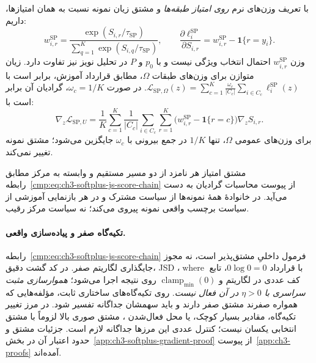 با تعریف وزن‌های نرم \emph{روی امتیاز طبقه‌ها}
و مشتق زیان نمونه نسبت به همان امتیازها، داریم:
\begin{equation}\label{cmp:eq:ch3-softplus-js-score-weights}
\boxed{
w_{i,r}^{\mathrm{SP}}
=\frac{\exp(S_{i,r}/\tau_{\mathrm{SP}})}
{\sum_{q=1}^{K}\exp(S_{i,q}/\tau_{\mathrm{SP}})},
\qquad
\frac{\partial\ell_i^{\mathrm{SP}}}{\partial S_{i,r}}
=w_{i,r}^{\mathrm{SP}}-\mathbf1\{r=y_i\}.
}
\end{equation}
وزن $w_{i,r}^{\mathrm{SP}}$ احتمال انتخاب ویژگی نیست
و با $p_0$ و $P$ در تحلیل نویز نیز تفاوت دارد.
زیان متوازن برای وزن‌های طبقات $\Omega$،
مطابق قرارداد آموزش، برابر است با
$\mathcal L_{\mathrm{SP},\Omega}(z)
=\sum_{c=1}^{K}\frac{\omega_c}{|C_c|}
\sum_{i\in C_c}\ell_i^{\mathrm{SP}}(z)$.
در صورت $\omega_c=1/K$، گرادیان آن برابر است با:
\begin{equation}\label{cmp:eq:ch3-softplus-js-policy-gradient}
\boxed{
\nabla_z\mathcal L_{\mathrm{SP},U}
=\frac1K\sum_{c=1}^{K}\frac1{|C_c|}
\sum_{i\in C_c}\sum_{r=1}^{K}
\bigl(w_{i,r}^{\mathrm{SP}}-\mathbf1\{r=c\}\bigr)
\nabla_z S_{i,r}.
}
\end{equation}
برای وزن‌های عمومی $\Omega$، تنها $1/K$ در جمع بیرونی
با $\omega_c$ جایگزین می‌شود؛ مشتق نمونه تغییر نمی‌کند.

مشتق امتیاز هر نامزد از دو مسیر مستقیم و
وابسته به مرکز مطابق
رابطه~\eqref{cmp:eq:ch3-softplus-js-score-chain}
از پیوست محاسبات گرادیان به دست می‌آید.
در خانوادهٔ  همهٔ نمونه‌ها از سیاست
مشترک و در  هر بازنمایی آموزشی از
سیاست برچسب واقعی نمونه پیروی می‌کند؛ نه سیاست
مرکز رقیب.

\paragraph{تکیه‌گاه صفر و پیاده‌سازی واقعی.}
رابطه~\eqref{cmp:eq:ch3-softplus-js-score-chain} فرمول
داخلیِ مشتق‌پذیر است، نه مجوز جایگذاری لگاریتم صفر.
در کد گشت دقیق، JSD با قرارداد $0\log0=0$،
تابع $\operatorname{where}$، کف عددی در لگاریتم
و $\operatorname{clamp}_{\min}(0)$ روی نتیجه اجرا می‌شود؛
\emph{هموارسازی مثبت سراسری با $\eta>0$ در آن فعال نیست}.
روی تکیه‌گاه‌های ساختاری ثابت، مؤلفه‌هایی که همواره صفرند
مشتق صفر دارند و باید سهمشان جداگانه تفسیر شود.
در مرز تغییر تکیه‌گاه، مقادیر بسیار کوچک، یا محل فعال‌شدن
، مشتق صوری بالا لزوماً با مشتق انتخابی
 یکسان نیست؛ کنترل عددی این مرزها جداگانه لازم است.
جزئیات مشتق و حدود اعتبار آن در
بخش~\ref{app:ch3-softplus-gradient-proof}
از پیوست~\ref{app:ch3-proofs}
آمده‌اند.

